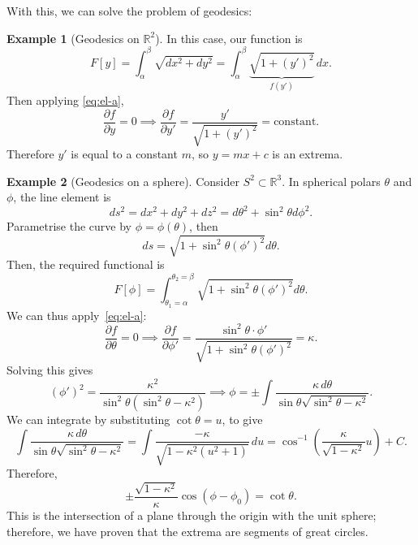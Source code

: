 \documentclass[12pt]{article}
\theoremstyle{definition}
\newtheorem{example}{Example}[section]
\theoremstyle{remark}
\begin{document}
With this, we can solve the problem of geodesics:

\begin{adjustbox}{minipage = \columnwidth - 25.5pt, margin=1em, frame=1pt, margin=0em}
	\begin{example}[Geodesics on $\mathbb{R}^2$]
	In this case, our function is
	\[
		F[y] = \int_{\alpha}^{\beta} \sqrt{dx^2 + dy^2} = \int_{\alpha}^{\beta} \underbrace{\sqrt{1 + (y')^2}}_{f(y')} \, dx
	.\]
	Then applying \eqref{eq:el-a},
	\[
		\frac{\partial f}{\partial y} = 0 \implies \frac{\partial f}{\partial y'} = \frac{y'}{\sqrt{1 + (y')^2}} = \text{constant}
	.\]
	Therefore $y'$ is equal to a constant $m$, so $y = mx + c$ is an extrema.
\end{example}

\end{adjustbox}

\begin{adjustbox}{minipage = \columnwidth - 25.5pt, margin=1em, frame=1pt, margin=0em}
	\begin{example}[Geodesics on a sphere]
		Consider $S^2 \subset \mathbb{R}^3$. In spherical polars $\theta$ and $\phi$, the line element is
		\[
		ds^2 = dx^2 + dy^2 + dz^2 = d\theta^2 + \sin^2\theta d\phi^2
		.\]
		Parametrise the curve by $\phi = \phi(\theta)$, then
		\[
			ds = \sqrt{1 + \sin^2\theta (\phi')^2} d \theta
		.\]
		Then, the required functional is
		\[
			F[\phi] = \int_{\theta_1 = \alpha}^{\theta_2 = \beta} \sqrt{1 + \sin^2\theta (\phi')^2}d \theta
		.\]
		We can thus apply~\eqref{eq:el-a}:
		\[
		\frac{\partial f}{\partial \theta} = 0 \implies \frac{\partial f}{\partial \phi'} = \frac{\sin^2\theta \cdot \phi'}{\sqrt{1 + \sin^2 \theta (\phi')^2 }} = \kappa
		.\]
		Solving this gives
		\[
			(\phi')^2 = \frac{\kappa^2}{\sin^2\theta (\sin^2\theta - \kappa^2)} \implies \phi = \pm \int \frac{\kappa\, d\theta}{\sin\theta\sqrt{\sin^2\theta - \kappa^2}}
		.\]
		We can integrate by substituting $\cot \theta = u$, to give
		\[
			\int \frac{\kappa\, d \theta}{\sin \theta \sqrt{\sin^2 \theta - \kappa^2}} = \int \frac{-\kappa}{\sqrt{1 - \kappa^2(u^2 + 1)}} \, du = \cos^{-1} \left( \frac{\kappa}{\sqrt{1 - \kappa^2}} u \right) + C
		.\]
		Therefore,
		\[
			\pm \frac{\sqrt{1 - \kappa^2}}{\kappa} \cos (\phi - \phi_0) = \cot \theta
		.\]
		This is the intersection of a plane through the origin with the unit sphere; therefore, we have proven that the extrema are segments of great circles.
\end{example}

\end{adjustbox}
\end{document}
